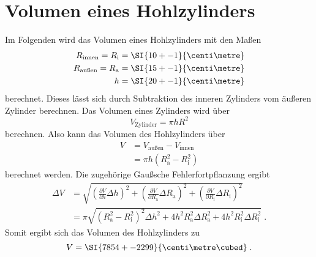 \section{Volumen eines Hohlzylinders}
\label{sec:Hohlzylinder}

Im Folgenden wird das Volumen eines Hohlzylinders mit den Maßen
\begin{align*}
    R_\text{innen} = R_\text{i} &= \SI{10+-1}{\centi\metre} \\
    R_\text{außen} = R_\text{a} &= \SI{15+-1}{\centi\metre} \\
    h &= \SI{20+-1}{\centi\metre}
\end{align*}
berechnet. Dieses lässt sich durch Subtraktion des inneren Zylinders vom äußeren Zylinder berechnen.
Das Volumen eines Zylinders wird über
\begin{equation}
    V_\text{Zylinder} = \pi h R^2
\end{equation}
berechnen.
Also kann das Volumen des Hohlzylinders über
\begin{align*}
    V &= V_\text{außen} - V_\text{innen} \\
    &= \pi h (R_\text{a}^2 - R_\text{i}^2) 
\end{align*}
berechnet werden.
Die zugehörige Gaußsche Fehlerfortpflanzung ergibt
\begin{align*}
    \Delta V &= \sqrt{\left(\frac{\partial V}{\partial h} \Delta h \right)^2 + \left(\frac{\partial V}{\partial R_\text{a}} \Delta R_\text{a} \right)^2 + \left(\frac{\partial V}{\partial R_\text{i}} \Delta R_\text{i} \right)^2} \\
    &= \pi \sqrt{ (R_\text{a}^2 - R_\text{i}^2)^2 \Delta h^2 + 4 h^2 R_\text{a}^2 \Delta R_\text{a}^2 + 4 h^2 R_\text{i}^2 \Delta R_\text{i}^2 } \; .
\end{align*}
Somit ergibt sich das Volumen des Hohlzylinders zu
\begin{equation}
    V = \SI{7854+-2299}{\centi\metre\cubed} \; .
\end{equation}